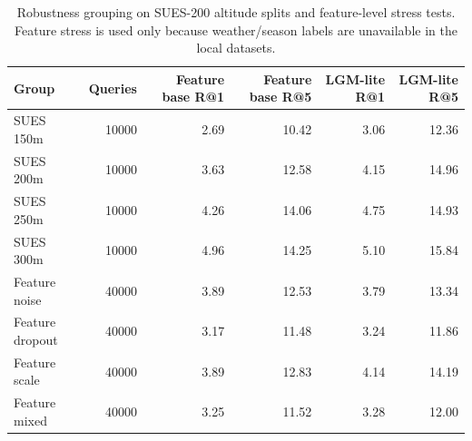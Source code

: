 \begin{table}[!t]
\centering
\footnotesize
\caption{Robustness grouping on SUES-200 altitude splits and feature-level stress tests. Feature stress is used only because weather/season labels are unavailable in the local datasets.}
\label{tab:publication_robustness}
\begin{tabular}{lrrrrr}
\toprule
Group & Queries & Feature base R@1 & Feature base R@5 & LGM-lite R@1 & LGM-lite R@5 \\
\midrule
SUES 150m & 10000 & 2.69 & 10.42 & 3.06 & 12.36 \\
SUES 200m & 10000 & 3.63 & 12.58 & 4.15 & 14.96 \\
SUES 250m & 10000 & 4.26 & 14.06 & 4.75 & 14.93 \\
SUES 300m & 10000 & 4.96 & 14.25 & 5.10 & 15.84 \\
Feature noise & 40000 & 3.89 & 12.53 & 3.79 & 13.34 \\
Feature dropout & 40000 & 3.17 & 11.48 & 3.24 & 11.86 \\
Feature scale & 40000 & 3.89 & 12.83 & 4.14 & 14.19 \\
Feature mixed & 40000 & 3.25 & 11.52 & 3.28 & 12.00 \\
\bottomrule
\end{tabular}
\end{table}
